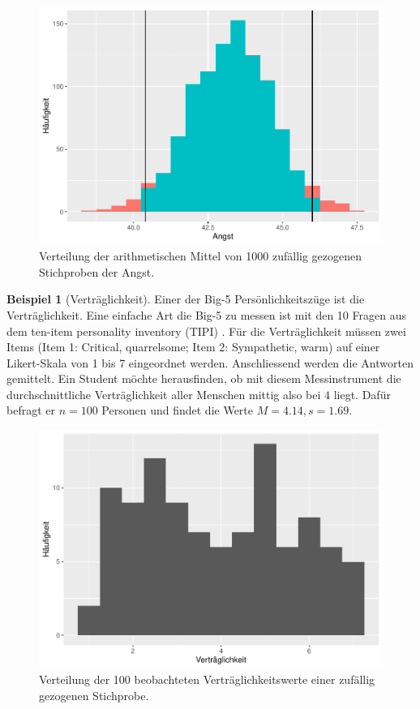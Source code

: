 \documentclass[
]{book}
\theoremstyle{definition}
\theoremstyle{definition}
\newtheorem{example}{Beispiel}[chapter]
\theoremstyle{definition}
\theoremstyle{definition}
\theoremstyle{remark}
\begin{document}
\begin{figure}
\centering
\includegraphics{aps_statistik1_files/figure-latex/exm-angst-hist-means-emp-ci-1.pdf}
\caption{\label{fig:exm-angst-hist-means-emp-ci}Verteilung der arithmetischen Mittel von 1000 zufällig gezogenen Stichproben der Angst.}
\end{figure}

\begin{example}[Verträglichkeit]
\protect\hypertarget{exm:agreableness}{}\label{exm:agreableness}Einer der Big-5 Persönlichkeitszüge ist die Verträglichkeit. Eine einfache Art die Big-5 zu messen ist mit den 10 Fragen aus dem ten-item personality inventory (TIPI) \citep{gosling2003}. Für die Verträglichkeit müssen zwei Items (Item 1: Critical, quarrelsome; Item 2: Sympathetic, warm) auf einer Likert-Skala von 1 bis 7 eingeordnet werden. Anschliessend werden die Antworten gemittelt. Ein Student möchte herausfinden, ob mit diesem Messinstrument die durchschnittliche Verträglichkeit aller Menschen mittig also bei \(4\) liegt. Dafür befragt er \(n = 100\) Personen und findet die Werte \(M=4.14, s = 1.69\).
\end{example}

\begin{figure}
\centering
\includegraphics{aps_statistik1_files/figure-latex/exm-agreableness-hist-1.pdf}
\caption{\label{fig:exm-agreableness-hist}Verteilung der 100 beobachteten Verträglichkeitswerte einer zufällig gezogenen Stichprobe.}
\end{figure}
\end{document}
